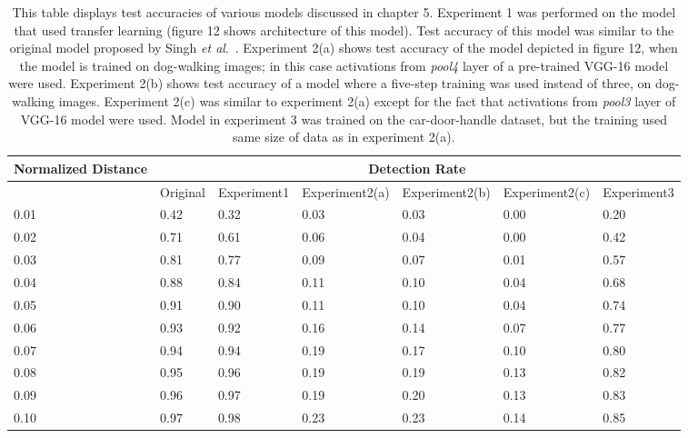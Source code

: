 \documentclass [11pt,letterpaper ,twoside ,openany ]{report}
\begin{document}
    \begin{table}[t]
    \centering
    \small
    \begin{tabular}{ | p{1.8cm} | p{1.8cm} | p{1.8cm} | p{2.2cm} | p{2.2cm} | p{2.2cm} |  p{1.8cm}| }
    \hline
    Normalized Distance &  \multicolumn{6}{|c|}{Detection Rate} \\ \hline
    & Original & Experiment1 & Experiment2(a) & Experiment2(b) & Experiment2(c) & Experiment3 \\ \hline
    0.01 & 0.42 & 0.32 & 0.03 & 0.03 & 0.00 & 0.20 \\ \hline
    0.02 & 0.71 & 0.61 & 0.06 & 0.04 & 0.00 & 0.42 \\ \hline
    0.03 & 0.81 & 0.77 & 0.09 & 0.07 & 0.01 & 0.57 \\ \hline
    0.04 & 0.88 & 0.84 & 0.11 & 0.10 & 0.04 & 0.68 \\ \hline
    0.05 & 0.91 & 0.90 & 0.11 & 0.10 & 0.04 & 0.74 \\ \hline
    0.06 & 0.93 & 0.92 & 0.16 & 0.14 & 0.07 & 0.77 \\ \hline
    0.07 & 0.94 & 0.94 & 0.19 & 0.17 & 0.10 & 0.80 \\ \hline
    0.08 & 0.95 & 0.96 & 0.19 & 0.19 & 0.13 & 0.82 \\ \hline
    0.09 & 0.96 & 0.97 & 0.19 & 0.20 & 0.13 & 0.83 \\ \hline
    0.10 & 0.97 & 0.98 & 0.23 & 0.23 & 0.14 & 0.85 \\ \hline
    \end{tabular}
    \caption{This table displays test accuracies of various models discussed in chapter 5. Experiment 1 was performed on the model that used transfer learning (figure 12 shows architecture of this model). Test accuracy of this model was similar to the original model proposed by Singh \textit{et al}.\ \cite{Singh_2016_CVPR}. Experiment 2(a) shows test accuracy of the model depicted in figure 12, when the model is trained on dog-walking images; in this case activations from \textit{pool4} layer of a pre-trained VGG-16 \cite{simonyan2014very} model were used. Experiment 2(b) shows test accuracy of a model where a five-step training was used instead of three, on dog-walking images. Experiment 2(c) was similar to experiment 2(a) except for the fact that activations from \textit{pool3} layer of VGG-16 model \cite{simonyan2014very} were used. Model in experiment 3 was trained on the car-door-handle dataset, but the training used same size of data as in experiment 2(a).}
    \end{table}
\end{document}
